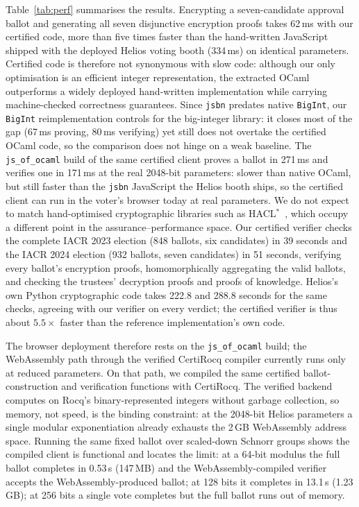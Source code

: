 Table~\ref{tab:perf} summarises the results. Encrypting a seven-candidate approval ballot and generating all seven disjunctive encryption proofs takes 62\,ms with our certified code, more than five times faster than the hand-written JavaScript shipped with the deployed Helios voting booth (334\,ms) on identical parameters. Certified code is therefore not synonymous with slow code: although our only optimisation is an efficient integer representation, the extracted OCaml outperforms a widely deployed hand-written implementation while carrying machine-checked correctness guarantees. Since \texttt{jsbn} predates native \texttt{BigInt}, our \texttt{BigInt} reimplementation controls for the big-integer library: it closes most of the gap (67\,ms proving, 80\,ms verifying) yet still does not overtake the certified OCaml code, so the comparison does not hinge on a weak baseline. The \texttt{js\_of\_ocaml} build of the same certified client proves a ballot in 271\,ms and verifies one in 171\,ms at the real 2048-bit parameters: slower than native OCaml, but still faster than the \texttt{jsbn} JavaScript the Helios booth ships, so the certified client can run in the voter's browser today at real parameters. We do not expect to match hand-optimised cryptographic libraries such as HACL$^{*}$~\cite{10.1145/3133956.3134043}, which occupy a different point in the assurance--performance space. Our certified verifier checks the complete IACR 2023 election (848 ballots, six candidates) in 39 seconds and the IACR 2024 election (932 ballots, seven candidates) in 51 seconds, verifying every ballot's encryption proofs, homomorphically aggregating the valid ballots, and checking the trustees' decryption proofs and proofs of knowledge. Helios's own Python cryptographic code takes 222.8 and 288.8 seconds for the same checks, agreeing with our verifier on every verdict; the certified verifier is thus about $5.5\times$ faster than the reference implementation's own code.

The browser deployment therefore rests on the \texttt{js\_of\_ocaml} build; the WebAssembly path through the verified CertiRocq compiler currently runs only at reduced parameters. On that path, we compiled the same certified ballot-construction and verification functions with CertiRocq. The verified backend computes on Rocq's binary-represented integers without garbage collection, so memory, not speed, is the binding constraint: at the 2048-bit Helios parameters a single modular exponentiation already exhausts the 2\,GB WebAssembly address space. Running the same fixed ballot over scaled-down Schnorr groups shows the compiled client is functional and locates the limit: at a 64-bit modulus the full ballot completes in 0.53\,s (147\,MB) and the WebAssembly-compiled verifier accepts the WebAssembly-produced ballot; at 128 bits it completes in 13.1\,s (1.23\,GB); at 256 bits a single vote completes but the full ballot runs out of memory. 

